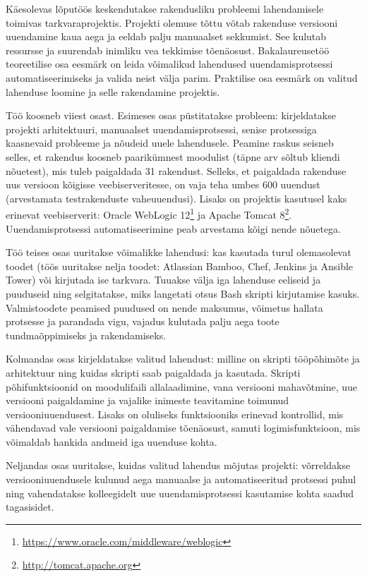 \documentclass[12pt]{article}
\begin{document}
  Käesolevas lõputöös keskendutakse rakendusliku probleemi lahendamisele toimivas tarkvaraprojektis. Projekti olemuse tõttu võtab rakenduse versiooni uuendamine kaua aega ja eeldab palju manuaalset sekkumist. See kulutab ressursse ja suurendab inimliku vea tekkimise tõenäosust. Bakalaureusetöö teoreetilise osa eesmärk on leida võimalikud lahendused uuendamisprotsessi automatiseerimiseks ja valida neist välja parim. Praktilise osa eesmärk on valitud lahenduse loomine ja selle rakendamine projektis.
  
  Töö koosneb viiest osast. Esimeses osas püstitatakse probleem: kirjeldatakse projekti arhitektuuri, manuaalset uuendamisprotsessi, senise protsessiga kaasnevaid probleeme ja nõudeid uuele lahendusele. Peamine raskus seisneb selles, et rakendus koosneb paarikümnest moodulist (täpne arv sõltub kliendi nõuetest), mis tuleb paigaldada 31 rakendust. Selleks, et paigaldada rakenduse uus versioon kõigisse veebiserveritesse, on vaja teha umbes 600 uuendust (arvestamata testrakenduste vaheuuendusi). Lisaks on projektis kasutusel kaks erinevat veebiserverit: Oracle WebLogic 12\footnote{\url{https://www.oracle.com/middleware/weblogic}} ja Apache Tomcat 8\footnote{\url{http://tomcat.apache.org}}. Uuendamisprotsessi automatiseerimine peab arvestama kõigi nende nõuetega.
  
  Töö teises osas uuritakse võimalikke lahendusi: kas kasutada turul olemasolevat toodet (töös uuritakse nelja toodet: Atlassian Bamboo, Chef, Jenkins ja Ansible Tower) või kirjutada ise tarkvara. Tuuakse välja iga lahenduse eeliseid ja puuduseid ning selgitatakse, miks langetati otsus Bash skripti kirjutamise kasuks. Valmistoodete peamised puudused on nende maksumus, võimetus hallata protsesse ja parandada vigu, vajadus kulutada palju aega toote tundmaõppimiseks ja rakendamiseks.
  
  Kolmandas osas kirjeldatakse valitud lahendust: milline on skripti tööpõhimõte ja arhitektuur ning kuidas skripti saab paigaldada ja kasutada. Skripti põhifunk\-tsioonid on moodulifaili allalaadimine, vana versiooni mahavõtmine, uue versiooni paigaldamine ja vajalike inimeste teavitamine toimunud versiooniuuendusest. Lisaks on oluliseks funktsiooniks erinevad kontrollid, mis vähendavad vale versiooni paigaldamise tõenäosust, samuti logimisfunktsioon, mis võimaldab hankida andmeid iga uuenduse kohta.
  
  Neljandas osas uuritakse, kuidas valitud lahendus mõjutas projekti: võrreldakse versiooniuuendusele kulunud aega manuaalse ja automatiseeritud protsessi puhul ning vahendatakse kolleegidelt uue uuendamisprotsessi kasutamise kohta saadud tagasisidet.
  
\end{document}
